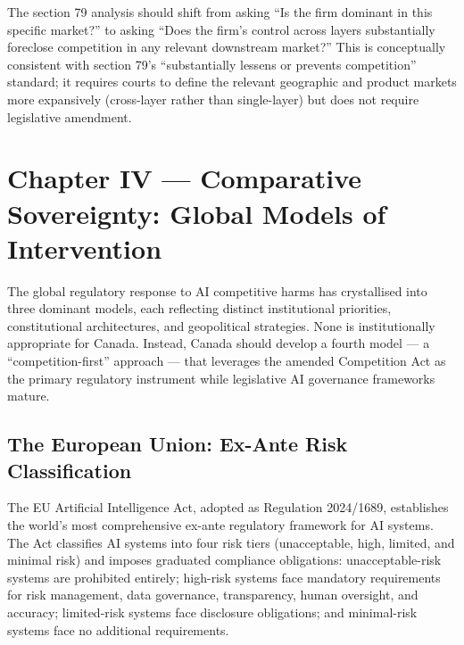 The section 79 analysis should shift from asking ``Is the firm dominant in this specific market?'' to asking ``Does the firm's control across layers substantially foreclose competition in any relevant downstream market?'' This is conceptually consistent with section 79's ``substantially lessens or prevents competition'' standard; it requires courts to define the relevant geographic and product markets more expansively (cross-layer rather than single-layer) but does not require legislative amendment.


\section{Chapter IV --- Comparative Sovereignty: Global Models of Intervention}
\label{ch:comparative}

The global regulatory response to AI competitive harms has crystallised into three dominant models, each reflecting distinct institutional priorities, constitutional architectures, and geopolitical strategies. None is institutionally appropriate for Canada. Instead, Canada should develop a fourth model --- a ``competition-first'' approach --- that leverages the amended Competition Act as the primary regulatory instrument while legislative AI governance frameworks mature.

\subsection{The European Union: Ex-Ante Risk Classification}

The EU Artificial Intelligence Act, adopted as Regulation 2024/1689, establishes the world's most comprehensive ex-ante regulatory framework for AI systems. The Act classifies AI systems into four risk tiers (unacceptable, high, limited, and minimal risk) and imposes graduated compliance obligations: unacceptable-risk systems are prohibited entirely; high-risk systems face mandatory requirements for risk management, data governance, transparency, human oversight, and accuracy; limited-risk systems face disclosure obligations; and minimal-risk systems face no additional requirements.

